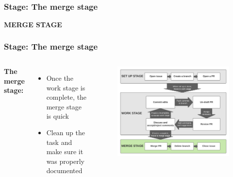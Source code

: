 \documentclass[aspectratio=169]{beamer} %
\begin{document}
\begin{frame}
	\frametitle{Stage: The merge stage}

	\huge\centering \textbf{MERGE STAGE}

\end{frame}

\begin{frame}
	\frametitle{Stage: The merge stage}
	\begin{columns}[c]


		\Large \textbf{The merge stage:}
		\vspace{1em}
		\normalsize
		\begin{itemize}
			\setlength\itemsep{.5em}
			\item Once the work stage is complete, the merge stage is quick
			\item Clean up the task and make sure it was properly documented
		\end{itemize}

		\vspace{-.75cm}
		\begin{figure}
			\centering
			\includegraphics[width=\textwidth]{./img/branch-pr-merge-cycle-S3.png}
		\end{figure}

	\end{columns}
\end{frame}
\end{document}
